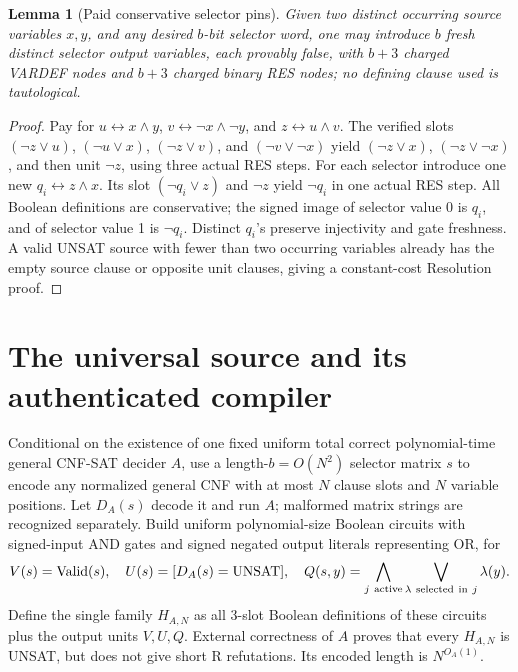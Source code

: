 \documentclass[11pt]{article}
\newtheorem{lemma}[theorem]{Lemma}
\begin{document}
\begin{lemma}[Paid conservative selector pins]\label{pins}
Given two distinct occurring source variables \(x,y\), and any desired \(b\)-bit selector word, one may introduce \(b\) fresh distinct selector output variables, each provably false, with \(b+3\) charged VARDEF nodes and \(b+3\) charged binary RES nodes; no defining clause used is tautological.
\end{lemma}
\begin{proof}
Pay for \(u\leftrightarrow x\land y\), \(v\leftrightarrow\neg x\land\neg y\), and \(z\leftrightarrow u\land v\). The verified slots \((\neg z\vee u)\), \((\neg u\vee x)\), \((\neg z\vee v)\), and \((\neg v\vee\neg x)\) yield \((\neg z\vee x)\), \((\neg z\vee\neg x)\), and then unit \(\neg z\), using three actual RES steps. For each selector introduce one new \(q_i\leftrightarrow z\land x\). Its slot \((\neg q_i\vee z)\) and \(\neg z\) yield \(\neg q_i\) in one actual RES step. All Boolean definitions are conservative; the signed image of selector value 0 is \(q_i\), and of selector value 1 is \(\neg q_i\). Distinct \(q_i\)'s preserve injectivity and gate freshness. A valid UNSAT source with fewer than two occurring variables already has the empty source clause or opposite unit clauses, giving a constant-cost Resolution proof.
\end{proof}

\section*{The universal source and its authenticated compiler}
Conditional on the existence of one fixed uniform total correct polynomial-time general CNF-SAT decider \(A\), use a length-\(b=O(N^2)\) selector matrix \(s\) to encode any normalized general CNF with at most \(N\) clause slots and \(N\) variable positions. Let \(D_A(s)\) decode it and run \(A\); malformed matrix strings are recognized separately. Build uniform polynomial-size Boolean circuits with signed-input AND gates and signed negated output literals representing OR, for
\[
V(s)=\mathrm{Valid}(s),\quad
U(s)=[D_A(s)=\mathrm{UNSAT}],\quad
Q(s,y)=\bigwedge_{j\ {\rm active}}\bigvee_{\lambda\ {\rm selected\ in}\ j}\lambda(y).
\]
Define the single family \(H_{A,N}\) as all 3-slot Boolean definitions of these circuits plus the output units \(V,U,Q\). External correctness of \(A\) proves that every \(H_{A,N}\) is UNSAT, but does not give short R refutations. Its encoded length is \(N^{O_A(1)}\).
\end{document}
